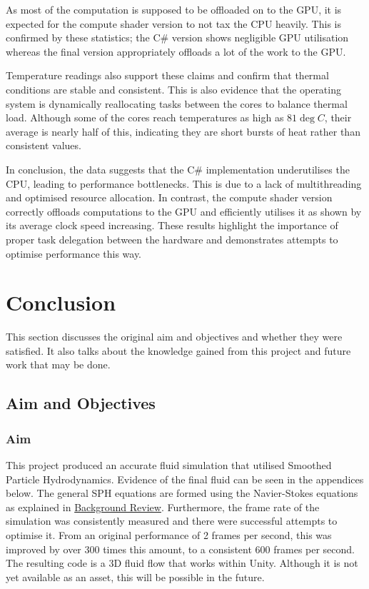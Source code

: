 \documentclass[12pt]{article}
\begin{document}
    As most of the computation is supposed to be offloaded on to the GPU, it is expected for the compute shader version to not tax the CPU heavily. This is confirmed by these statistics; the C\# version shows negligible GPU utilisation whereas the final version appropriately offloads a lot of the work to the GPU.

    Temperature readings also support these claims and confirm that thermal conditions are stable and consistent. This is also evidence that the operating system is dynamically reallocating tasks between the cores to balance thermal load. Although some of the cores reach temperatures as high as $81\deg C$, their average is nearly half of this, indicating they are short bursts of heat rather than consistent values.
    
    In conclusion, the data suggests that the C\# implementation underutilises the CPU, leading to performance bottlenecks. This is due to a lack of multithreading and optimised resource allocation. In contrast, the compute shader version correctly offloads computations to the GPU and efficiently utilises it as shown by its average clock speed increasing. These results highlight the importance of proper task delegation between the hardware and demonstrates attempts to optimise performance this way. 

    \newpage

    \section{Conclusion}
    \label{sec:conclusion}

    This section discusses the original aim and objectives and whether they were satisfied. It also talks about the knowledge gained from this project and future work that may be done.

    \subsection{Aim and Objectives}

    \subsubsection{Aim}

    This project produced an accurate fluid simulation that utilised Smoothed Particle Hydrodynamics. Evidence of the final fluid can be seen in the appendices below. The general SPH equations are formed using the Navier-Stokes equations as explained in \hyperref[sec:backgroundreview]{Background Review}. Furthermore, the frame rate of the simulation was consistently measured and there were successful attempts to optimise it. From an original performance of 2 frames per second, this was improved by over 300 times this amount, to a consistent 600 frames per second. The resulting code is a 3D fluid flow that works within Unity. Although it is not yet available as an asset, this will be possible in the future.
\end{document}
